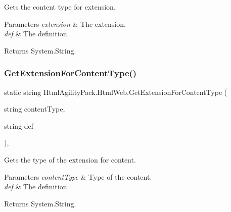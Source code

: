 Gets the content type for extension. 


\begin{DoxyParams}{Parameters}
{\em extension} & The extension.\\
\hline
{\em def} & The definition.\\
\hline
\end{DoxyParams}
\begin{DoxyReturn}{Returns}
System.\+String.
\end{DoxyReturn}
\mbox{\label{class_html_agility_pack_1_1_html_web_ae5c69da6ed02e1fdce6708e043e22483}} 
\subsubsection{\texorpdfstring{Get\+Extension\+For\+Content\+Type()}{GetExtensionForContentType()}}
{\footnotesize\ttfamily static string Html\+Agility\+Pack.\+Html\+Web.\+Get\+Extension\+For\+Content\+Type (\begin{DoxyParamCaption}\item[{string}]{content\+Type,  }\item[{string}]{def }\end{DoxyParamCaption})\hspace{0.3cm}{\ttfamily [inline]}, {\ttfamily [static]}}



Gets the type of the extension for content. 


\begin{DoxyParams}{Parameters}
{\em content\+Type} & Type of the content.\\
\hline
{\em def} & The definition.\\
\hline
\end{DoxyParams}
\begin{DoxyReturn}{Returns}
System.\+String.
\end{DoxyReturn}
\mbox{\label{class_html_agility_pack_1_1_html_web_a5a6f931d515b78d0ad88c00602e66a93}} 
